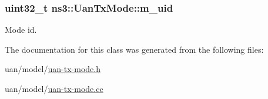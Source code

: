 \subsubsection[{\texorpdfstring{m\+\_\+uid}{m_uid}}]{\setlength{\rightskip}{0pt plus 5cm}uint32\+\_\+t ns3\+::\+Uan\+Tx\+Mode\+::m\+\_\+uid\hspace{0.3cm}{\ttfamily [private]}}\hypertarget{classns3_1_1UanTxMode_ae2cb9903f367a8fe6bed9d534c9f0147}{}\label{classns3_1_1UanTxMode_ae2cb9903f367a8fe6bed9d534c9f0147}


Mode id. 



The documentation for this class was generated from the following files\+:\begin{DoxyCompactItemize}
\item 
uan/model/\hyperlink{uan-tx-mode_8h}{uan-\/tx-\/mode.\+h}\item 
uan/model/\hyperlink{uan-tx-mode_8cc}{uan-\/tx-\/mode.\+cc}\end{DoxyCompactItemize}
